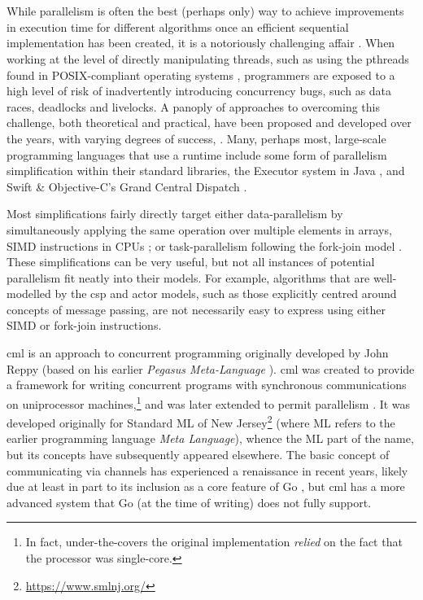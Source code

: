 \section{\label{sec:back:cml}}

While parallelism is often the best (perhaps only) way to achieve improvements in execution time for different algorithms once an efficient sequential implementation has been created, it is a notoriously challenging affair \cite{Shun2017}.  When working at the level of directly manipulating threads, such as using the pthreads found in POSIX-compliant operating systems \cite{posix2017}, programmers are exposed to a high level of risk of inadvertently introducing concurrency bugs, such as data races, deadlocks and livelocks.  A panoply of approaches to overcoming this challenge, both theoretical and practical, have been proposed and developed over the years, with varying degrees of success, \eg{} \cite{Boyapati2002,Bocq2012,Seinstra2004}.  Many, perhaps most, large-scale programming languages that use a runtime include some form of parallelism simplification within their standard libraries, \eg{} the Executor system in Java \cite[Ch. 4]{Fernandez2012}, and Swift \& Objective-C's Grand Central Dispatch \cite{Maskrey2018}.

Most simplifications fairly directly target either data-parallelism by simultaneously applying the same operation over multiple elements in arrays, \eg{} SIMD instructions in CPUs \cite{Hughes2015}; or task-parallelism following the fork-join model \cite{McCool2012}.  These simplifications can be very useful, but not all instances of potential parallelism fit neatly into their models.  For example, algorithms that are well-modelled by the \gls{csp} and \gls{actor} models, such as those explicitly centred around concepts of message passing, are not necessarily easy to express using either SIMD or fork-join instructions.

\Gls{cml} \cite{Reppy1991,Panangaden1997} is an approach to concurrent programming originally developed by John Reppy (based on his earlier \emph{Pegasus Meta-Language} \cite{Reppy1988}).  \Gls{cml} was created to provide a framework for writing concurrent programs with synchronous communications on uniprocessor machines,\footnote{In fact, under-the-covers the original implementation \emph{relied} on the fact that the processor was single-core.} and was later extended to permit parallelism \cite{Reppy2009a}.  It was developed originally for Standard ML of New Jersey\footnote{\url{https://www.smlnj.org/}} (where ML refers to the earlier programming language \emph{Meta Language}), whence the ML part of the name, but its concepts have subsequently appeared elsewhere.  The basic concept of communicating via channels has experienced a renaissance in recent years, likely due at least in part to its inclusion as a core feature of Go \cite{Meyerson2014}, but \gls{cml} has a more advanced system that Go (at the time of writing) does not fully support.

